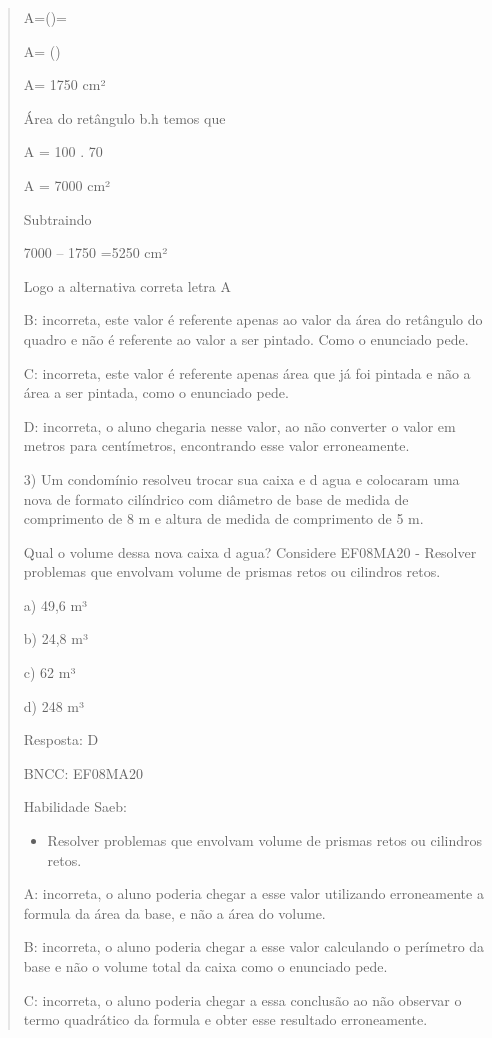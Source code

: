 \begin{quote}
\begin{escolha}

A=()=

A= ()

A= 1750 cm²

Área do retângulo b.h temos que

A = 100 . 70

A = 7000 cm²

Subtraindo

7000 -- 1750 =5250 cm²

Logo a alternativa correta letra A

B: incorreta, este valor é referente apenas ao valor da área do
retângulo do quadro e não é referente ao valor a ser pintado. Como o
enunciado pede.

C: incorreta, este valor é referente apenas área que já foi pintada e
não a área a ser pintada, como o enunciado pede.

D: incorreta, o aluno chegaria nesse valor, ao não converter o valor em
metros para centímetros, encontrando esse valor erroneamente.

3) Um condomínio resolveu trocar sua caixa e d agua e colocaram uma nova
de formato cilíndrico com diâmetro de base de medida de comprimento de 8
m e altura de medida de comprimento de 5 m.

Qual o volume dessa nova caixa d agua? Considere 
EF08MA20 - Resolver problemas que envolvam volume de prismas retos ou
cilindros retos.

a) 49,6 m³

b) 24,8 m³

c) 62 m³

d) 248 m³

Resposta: D

BNCC: EF08MA20

Habilidade Saeb:

\begin{itemize}
\tightlist
\item
  Resolver problemas que envolvam volume de prismas retos ou cilindros
  retos.
\end{itemize}

A: incorreta, o aluno poderia chegar a esse valor utilizando
erroneamente a formula da área da base, e não a área do volume.

B: incorreta, o aluno poderia chegar a esse valor calculando o perímetro
da base e não o volume total da caixa como o enunciado pede.

C: incorreta, o aluno poderia chegar a essa conclusão ao não observar o
termo quadrático da formula e obter esse resultado erroneamente.


\end{escolha}
\end{quote}
